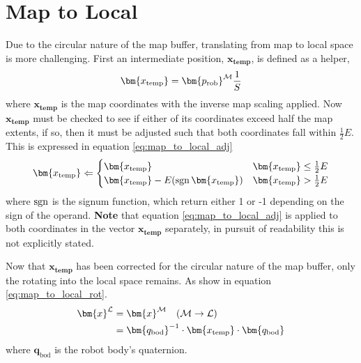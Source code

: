     \section{Map to Local}
        Due to the circular nature of the map buffer, translating from map to local space is more challenging. First an intermediate position, \(\bm{x_\text{temp}}\), is defined as a helper,
        \begin{equation} \label{eq:map_to_local_help}
            \bm{x_\text{temp}} = \bm{p_\text{rob}}\inrefframe{M}\frac{1}{S}
        \end{equation}
        where \(\bm{x_\text{temp}}\) is the map coordinates with the inverse map scaling applied. Now \(\bm{x_\text{temp}}\) must be checked to see if either of its 
        coordinates exceed half the map extents, if so, then it must be adjusted such that both coordinates fall within \(\frac{1}{2}E\).
        This is expressed in equation \ref{eq:map_to_local_adj}
        \begin{equation} \label{eq:map_to_local_adj}
            \bm{x_\text{temp}} \Leftarrow 
            \begin{cases}
                \bm{x_\text{temp}} & \bm{x_\text{temp}} \leq \frac{1}{2}E \\
                \bm{x_\text{temp}} - E(\sgn \bm{x_\text{temp}}) & \bm{x_\text{temp}} > \frac{1}{2}E
            \end{cases}
        \end{equation}
        where \(\operatorname{sgn}\) is the signum function, which return either 1 or -1 depending on the sign of the operand. 
        \textbf{Note} that equation \ref{eq:map_to_local_adj} is applied to both coordinates in the vector \(\bm{x_\text{temp}}\) separately, in pursuit of readability this is not explicitly stated.

        Now that \(\bm{x_\text{temp}}\) has been corrected for the circular nature of the map buffer, only the rotating into the local space remains. As show in equation \ref{eq:map_to_local_rot}.
        \begin{align} \label{eq:map_to_local_rot}
        \begin{split}
            \bm{x}\inrefframe{L} &= \bm{x}\inrefframe{M} \transframe{M}{L} \\
            &= \bm{q_\text{bod}}^{-1} \cdot \bm{x_\text{temp}} \cdot \bm{q_\text{bod}}
        \end{split}
        \end{align}
        where \(\bm{q}_\text{bod}\) is the robot body's quaternion.